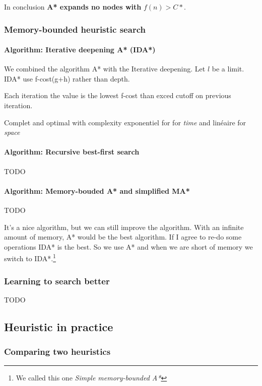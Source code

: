 In conclusion \textbf{A* expands no nodes with} $f(n) > C*$.

\subsubsection{Memory-bounded heuristic search}


\paragraph{Algorithm: Iterative deepening A* (IDA*)}

We combined the algorithm A* with the Iterative deepening. Let $l$ be a limit.
IDA* use f-cost(g+h) rather than depth.

Each iteration the value is the lowest f-cost than exced cutoff on previous iteration.

Complet and  optimal with  complexity exponentiel for  for \textit{time}
and linéaire for \textit{space} 

\paragraph{Algorithm: Recursive best-first search}
TODO

\paragraph{Algorithm: Memory-bouded A* and simplified MA*}
TODO

It's a nice  algorithm, but we can still improve  the algorithm. With an
infinite amount of memory, A* would be the best algorithm. If I agree to
re-do  some operations  IDA* is  the  best. So  we  use A*  and when  we
are  short of  memory we  switch  to IDA*.\footnote{We  called this  one
\textit{Simple memory-bounded A*}}




\subsubsection{Learning to search better}
TODO

\subsection{Heuristic in practice}

\subsubsection{Comparing two heuristics}

